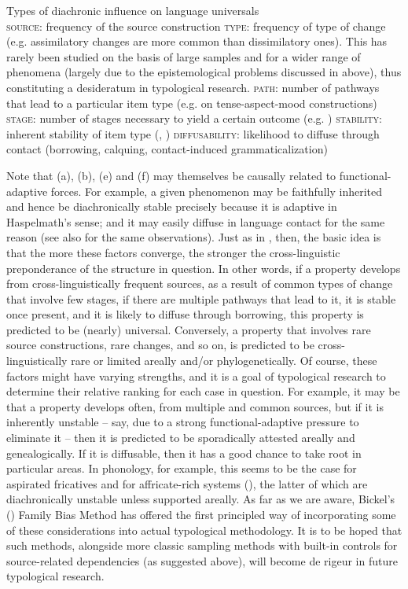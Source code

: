 \documentclass[output=paper]{langsci/langscibook}
\begin{document}
\ea
Types of diachronic influence on language universals\\
  \ea \textsc{source}: frequency of the source construction 
  \ex \textsc{type}: frequency of type of change (e.g. assimilatory changes are more common than dissimilatory ones). This has rarely been studied on the basis of large samples and for a wider range of phenomena (largely due to the epistemological problems discussed in  above), thus constituting a desideratum in typological research.
  \ex \textsc{path}: number of pathways that lead to a particular item type (e.g. \citealt{BybeeEtAl1994} on tense-aspect-mood constructions)
  \ex \textsc{stage}: number of stages necessary to yield a certain outcome (e.g. \citealt{Harris2008})
  \ex \textsc{stability}: inherent stability of item type (\citealt{Greenberg1978_Diachr}, \citealt{Nichols2003}) 
  \ex \textsc{diffusability:} likelihood to diffuse through contact (borrowing, calquing, contact-induced grammaticalization)
  \z
\z

Note that (a), (b), (e) and (f) may themselves be causally related to functional-adaptive forces. For example, a given phenomenon may be faithfully inherited and hence be diachronically stable precisely because it is adaptive in Haspelmath’s sense; and it may easily diffuse in language contact for the same reason (see also \citealt{Bickel2013,Bickel2017} for the same observations). 
Just as in \citet{Greenberg1978_Diachr}, then, the basic idea is that the more these factors converge, the stronger the cross-linguistic preponderance of the structure in question. In other words, if a property develops from cross-linguistically frequent sources, as a result of common types of change that involve few stages, if there are multiple pathways that lead to it, it is stable once present, and it is likely to diffuse through borrowing, this property is predicted to be (nearly) universal. Conversely, a property that involves rare source constructions, rare changes, and so on, is predicted to be cross-linguistically rare or limited areally and/or phylogenetically. Of course, these factors might have varying strengths, and it is a goal of typological research to determine their relative ranking for each case in question. For example, it may be that a property develops often, from multiple and common sources, but if it is inherently unstable – say, due to a strong functional-adaptive pressure to eliminate it – then it is predicted to be sporadically attested areally and genealogically. If it is diffusable, then it has a good chance to take root in particular areas. In phonology, for example, this seems to be the case for aspirated fricatives \citep{Jacques2011} and for affricate-rich systems (\citealt{NikolaevGrossman2018}), the latter of which are diachronically unstable unless supported areally. As far as we are aware, Bickel’s (\citeyear{Bickel2011_Modelling,Bickel2013}) Family Bias Method has offered the first principled way of incorporating some of these considerations into actual typological methodology. It is to be hoped that such methods, alongside more classic sampling methods with built-in controls for source-related dependencies (as suggested above), will become de rigeur in future typological research.
\end{document}
